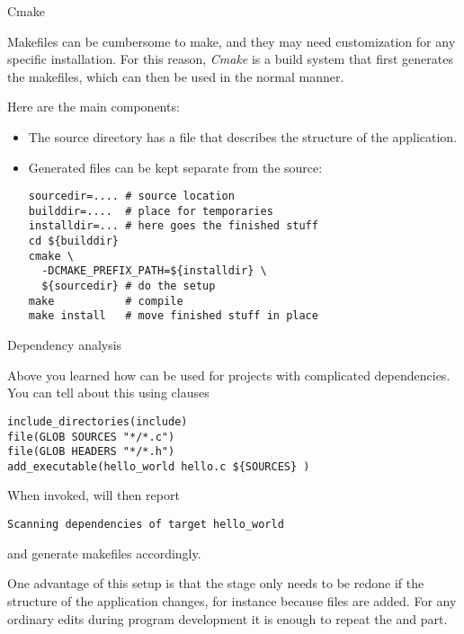 
 {Cmake}

Makefiles can be cumbersome to make, and they may need customization
for any specific installation. For this reason, \emph{Cmake} is a
build system that first generates the makefiles, which can then be
used in the normal manner.

Here are the main components:
\begin{itemize}
\item The source directory has a file 
  that describes the structure of the application.
\item Generated files can be kept separate from the source:
\begin{verbatim}
sourcedir=.... # source location
builddir=....  # place for temporaries
installdir=... # here goes the finished stuff
cd ${builddir}
cmake \
  -DCMAKE_PREFIX_PATH=${installdir} \
  ${sourcedir} # do the setup
make           # compile
make install   # move finished stuff in place
\end{verbatim}
\end{itemize}

 {Dependency analysis}

Above you learned how  can be used for projects with
complicated dependencies. You can tell  about this using
clauses
\begin{verbatim}
include_directories(include)
file(GLOB SOURCES "*/*.c")
file(GLOB HEADERS "*/*.h")
add_executable(hello_world hello.c ${SOURCES} )
\end{verbatim}
When invoked,  will then report
\begin{verbatim}
Scanning dependencies of target hello_world
\end{verbatim}
and generate makefiles accordingly.

One advantage of this setup is that the  stage only needs to
be redone if the structure of the application changes, for instance
because files are added. For any ordinary edits during program
development it is enough to repeat the \n{make} and \n{make install}
part.

